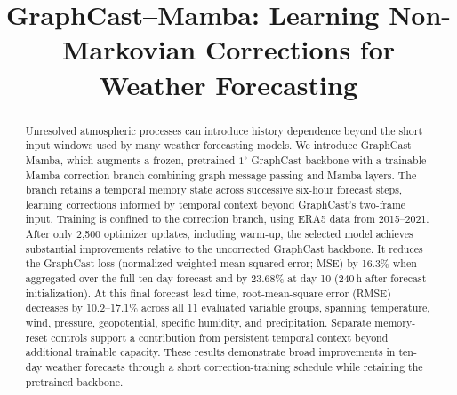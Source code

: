 \documentclass{article}
\title{GraphCast--Mamba: Learning Non-Markovian Corrections for Weather Forecasting}
\author{
}
\newcommand{\suozhi}[1]{}
\renewcommand{\suozhi}[1]{}
\begin{document}
\maketitle


\begin{abstract}
{Unresolved atmospheric processes can introduce history dependence beyond the short input windows used by many weather forecasting models. We introduce GraphCast--Mamba, which augments a frozen, pretrained \(1^\circ\) GraphCast backbone with a trainable Mamba correction branch combining graph message passing and Mamba layers. The branch retains a temporal memory state across successive six-hour forecast steps, learning corrections informed by temporal context beyond GraphCast's two-frame input. Training is confined to the correction branch, using ERA5 data from 2015--2021. After only 2,500 optimizer updates, including warm-up, the selected model achieves substantial improvements relative to the uncorrected GraphCast backbone. It reduces the {GraphCast loss (normalized weighted mean-squared error; MSE)} by 16.3\% when aggregated over the full ten-day forecast and by 23.68\% at day 10 (240\,h after forecast initialization). At this final forecast lead time, root-mean-square error (RMSE) decreases by 10.2--17.1\% across all 11 evaluated variable groups, spanning temperature, wind, pressure, geopotential, specific humidity, and precipitation. Separate memory-reset controls support a contribution from persistent temporal context beyond additional trainable capacity. These results demonstrate broad improvements in ten-day weather forecasts through a short correction-training schedule while retaining the pretrained backbone.}
\end{abstract}
\end{document}
